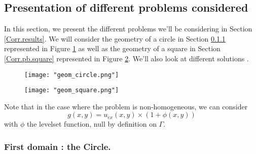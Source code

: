 
\subsection{Presentation of different problems considered}


In this section, we present the different problems we'll be considering in Section \ref{Corr.results}. We will consider the geometry of a circle in Section \ref{Corr.pb.circle} represented in Figure \ref{geom_circle} as well as the geometry of a square in Section \ref{Corr.pb.square} represented in Figure \ref{geom_square}. We'll also look at different solutions .

\begin{minipage}{0.48\linewidth}
	\begin{figure}[H]
		\centering
		\texttt{[image: "geom\_circle.png"]}
		\label{geom_circle}
	\end{figure} 
\end{minipage}
\begin{minipage}{0.48\linewidth}
	\begin{figure}[H]
		\centering
		\texttt{[image: "geom\_square.png"]}
		\label{geom_square}
	\end{figure} 
\end{minipage}

\begin{Rem}
	Note that in the case where the problem is non-homogeneous, we can consider
	\begin{equation*}
	g(x,y)=u_{ex}(x,y)\times(1+\phi(x,y))
	\end{equation*}
	with $\phi$ the levelset function, null by definition on $\Gamma$.
\end{Rem}

\subsubsection{First domain : the Circle.} \label{Corr.pb.circle}

